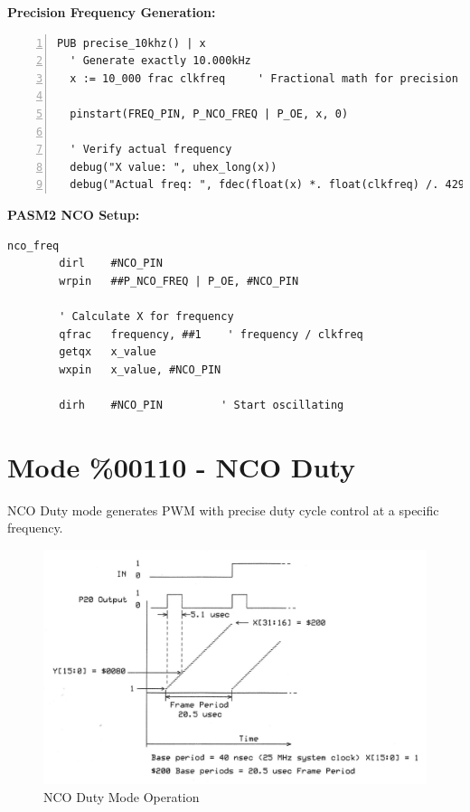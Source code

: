 \documentclass[11pt,a4paper,oneside,english]{book}
\begin{document}
\textbf{Precision Frequency Generation:}

\begin{Spin2Block}
\begin{Verbatim}[numbers=left,numbersep=5pt,xleftmargin=15pt]
PUB precise_10khz() | x
  ' Generate exactly 10.000kHz
  x := 10_000 frac clkfreq     ' Fractional math for precision
  
  pinstart(FREQ_PIN, P_NCO_FREQ | P_OE, x, 0)
  
  ' Verify actual frequency
  debug("X value: ", uhex_long(x))
  debug("Actual freq: ", fdec(float(x) *. float(clkfreq) /. 4294967296.0))
\end{Verbatim}
\end{Spin2Block}

\textbf{PASM2 NCO Setup:}

\begin{PASM2Block}
\begin{lstlisting}
nco_freq
        dirl    #NCO_PIN
        wrpin   ##P_NCO_FREQ | P_OE, #NCO_PIN
        
        ' Calculate X for frequency
        qfrac   frequency, ##1    ' frequency / clkfreq
        getqx   x_value
        wxpin   x_value, #NCO_PIN
        
        dirh    #NCO_PIN         ' Start oscillating
\end{lstlisting}
\end{PASM2Block}

\clearpage

\hypertarget{mode-00110---nco-duty}{%
\section{Mode \%00110 - NCO Duty}\label{mode-00110---nco-duty}}

NCO Duty mode generates PWM with precise duty cycle control at a
specific frequency.

\begin{figure}
\centering
\includegraphics{assets/P2 SmartPins-220809_page21_img01.png}
\caption{NCO Duty Mode Operation}
\end{figure}
\end{document}
